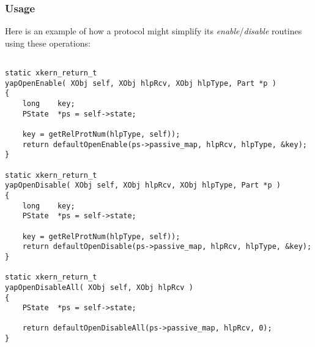 \subsubsection {Usage}

Here is an example of how a protocol might simplify its 
{\em enable}/{\em disable} routines using these operations:

\begin{verbatim}

static xkern_return_t
yapOpenEnable( XObj self, XObj hlpRcv, XObj hlpType, Part *p )
{
    long    key;
    PState  *ps = self->state;
    
    key = getRelProtNum(hlpType, self));
    return defaultOpenEnable(ps->passive_map, hlpRcv, hlpType, &key);
}

static xkern_return_t
yapOpenDisable( XObj self, XObj hlpRcv, XObj hlpType, Part *p )
{
    long    key;
    PState  *ps = self->state;
    
    key = getRelProtNum(hlpType, self));
    return defaultOpenDisable(ps->passive_map, hlpRcv, hlpType, &key);
}

static xkern_return_t
yapOpenDisableAll( XObj self, XObj hlpRcv )
{
    PState  *ps = self->state;

    return defaultOpenDisableAll(ps->passive_map, hlpRcv, 0);
}
\end{verbatim}
